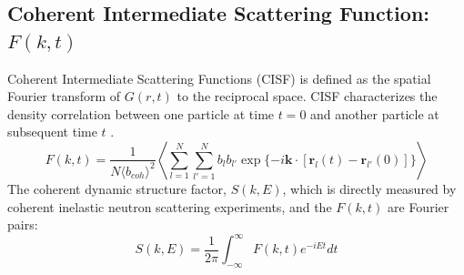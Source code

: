 \documentclass{article}
\begin{document}
\subsection{Coherent Intermediate Scattering Function: $F(k,t)$} \label{sec::Fqt}
Coherent Intermediate Scattering Functions (CISF) is defined as the spatial Fourier transform of $G(r,t)$ to the reciprocal space. CISF characterizes the density correlation between one particle at time $t = 0$ and another particle at subsequent time $t$ \cite{EGELSTAFF, Hansen}.
\begin{equation}
	\label{eq:fqt}
	F(k,t) = \frac{1}{N\langle b_{coh}\rangle^2} \left\langle \sum_{l=1}^{N}\sum_{l'=1}^{N} b_lb_{l'}\exp{\{-i\mathbf{k}\cdot[\mathbf{r}_l(t) - \mathbf{r}_{l'}(0)]}\}\right\rangle
\end{equation} 
The coherent dynamic structure factor, $S(k,E)$, which is directly measured by coherent inelastic neutron scattering experiments, and the $F(k,t)$ are Fourier pairs:
\begin{equation}
	S(k,E) = \frac{1}{2\pi} \int_{-\infty}^\infty F(k,t) e^{-iEt} dt
\end{equation}  
\end{document}
